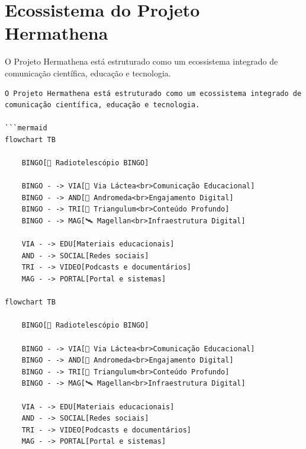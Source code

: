 \section{Ecossistema do Projeto Hermathena}

O Projeto Hermathena está estruturado como um ecossistema integrado de comunicação científica, educação e tecnologia.

\begin{verbatim}
O Projeto Hermathena está estruturado como um ecossistema integrado de comunicação científica, educação e tecnologia.

```mermaid
flowchart TB

    BINGO[🔭 Radiotelescópio BINGO]

    BINGO - -> VIA[🌌 Via Láctea<br>Comunicação Educacional]
    BINGO - -> AND[🌠 Andromeda<br>Engajamento Digital]
    BINGO - -> TRI[🔭 Triangulum<br>Conteúdo Profundo]
    BINGO - -> MAG[🛰 Magellan<br>Infraestrutura Digital]

    VIA - -> EDU[Materiais educacionais]
    AND - -> SOCIAL[Redes sociais]
    TRI - -> VIDEO[Podcasts e documentários]
    MAG - -> PORTAL[Portal e sistemas]

flowchart TB

    BINGO[🔭 Radiotelescópio BINGO]

    BINGO - -> VIA[🌌 Via Láctea<br>Comunicação Educacional]
    BINGO - -> AND[🌠 Andromeda<br>Engajamento Digital]
    BINGO - -> TRI[🔭 Triangulum<br>Conteúdo Profundo]
    BINGO - -> MAG[🛰 Magellan<br>Infraestrutura Digital]

    VIA - -> EDU[Materiais educacionais]
    AND - -> SOCIAL[Redes sociais]
    TRI - -> VIDEO[Podcasts e documentários]
    MAG - -> PORTAL[Portal e sistemas]
\end{verbatim}